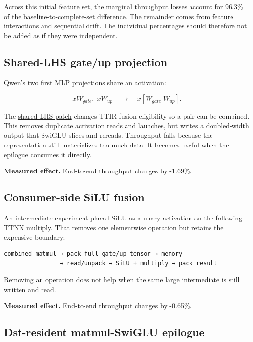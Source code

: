 \documentclass[
  10pt,
  american,
  10pt,
  letterpaper]{article}
\begin{document}
Across this initial feature set, the marginal throughput losses account
for 96.3\% of the baseline-to-complete-set difference. The remainder
comes from feature interactions and sequential drift. The individual
percentages should therefore not be added as if they were independent.

\hypertarget{shared-lhs-gateup-projection}{%
\subsection{Shared-LHS gate/up
projection}\label{shared-lhs-gateup-projection}}

Qwen's two first MLP projections share an activation:

\[
xW_{gate},\;xW_{up}
\quad\longrightarrow\quad
x[W_{gate}\;W_{up}].
\]

The
\href{../../third_party/tt_xla/tt_mlir_fuse_shared_lhs_matmul_pairs.patch}{shared-LHS
patch} changes TTIR fusion eligibility so a pair can be combined. This
removes duplicate activation reads and launches, but writes a
doubled-width output that SwiGLU slices and rereads. Throughput falls
because the representation still materializes too much data. It becomes
useful when the epilogue consumes it directly.

\textbf{Measured effect.} End-to-end throughput changes by -1.69\%.

\hypertarget{consumer-side-silu-fusion}{%
\subsection{Consumer-side SiLU fusion}\label{consumer-side-silu-fusion}}

An intermediate experiment placed SiLU as a unary activation on the
following TTNN multiply. That removes one elementwise operation but
retains the expensive boundary:

\begin{verbatim}
combined matmul → pack full gate/up tensor → memory
                → read/unpack → SiLU + multiply → pack result
\end{verbatim}

Removing an operation does not help when the same large intermediate is
still written and read.

\textbf{Measured effect.} End-to-end throughput changes by -0.65\%.

\hypertarget{dst-resident-matmul-swiglu-epilogue}{%
\subsection{Dst-resident matmul-SwiGLU
epilogue}\label{dst-resident-matmul-swiglu-epilogue}}
\end{document}
